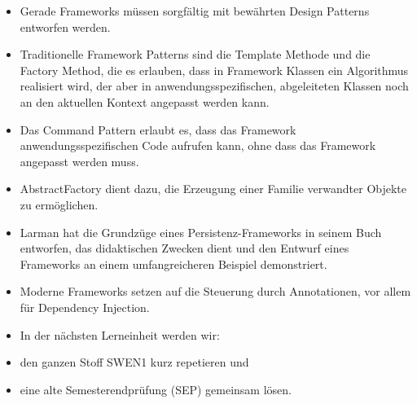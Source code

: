 \begin{itemize}
  \item Gerade Frameworks müssen sorgfältig mit bewährten Design Patterns entworfen werden.
  \item Traditionelle Framework Patterns sind die Template Methode und die Factory Method, die es erlauben, dass in Framework Klassen ein Algorithmus realisiert wird, der aber in anwendungsspezifischen, abgeleiteten Klassen noch an den aktuellen Kontext angepasst werden kann.
  \item Das Command Pattern erlaubt es, dass das Framework anwendungsspezifischen Code aufrufen kann, ohne dass das Framework angepasst werden muss.
  \item AbstractFactory dient dazu, die Erzeugung einer Familie verwandter Objekte zu ermöglichen.
  \item Larman hat die Grundzüge eines Persistenz-Frameworks in seinem Buch entworfen, das didaktischen Zwecken dient und den Entwurf eines Frameworks an einem umfangreicheren Beispiel demonstriert.
  \item Moderne Frameworks setzen auf die Steuerung durch Annotationen, vor allem für Dependency Injection.
  \item In der nächsten Lerneinheit werden wir:
  \item den ganzen Stoff SWEN1 kurz repetieren und
  \item eine alte Semesterendprüfung (SEP) gemeinsam lösen.
\end{itemize}